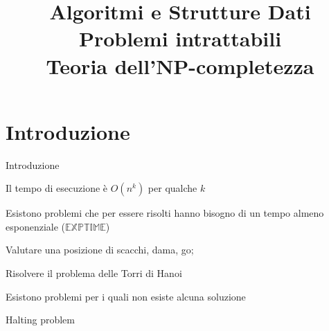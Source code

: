 
\title[ASD - Problemi \NP-completi]{\textbf{Algoritmi e Strutture Dati}\\[12pt]Problemi intrattabili\\Teoria dell'NP-completezza}


\usepackage{xcolor}
\usepackage{colortbl}

\newcommand{\PTIME}{\mbox{\sc $\mathbb{P}$}}
\renewcommand{\NP}{\mbox{$\mathbb{NP}$}}
\newcommand{\TIME}{\mbox{$\mathbb{TIME}$}}
\newcommand{\EXPTIME}{\mbox{$\mathbb{EXPTIME}$}}
\newcommand{\SPACE}{\mbox{$\mathbb{SPACE}$}}
\newcommand{\PSPACE}{\mbox{$\mathbb{PSPACE}$}}

\newcommand{\R}[1]{\textcolor{red}{#1}}
\newcommand{\B}[1]{\textcolor{blue}{#1}}

\renewcommand{\arraystretch}{1.4}
\graphicspath{{figs/18/}}




\FrameTitle{}

\FrameContent



\section{Introduzione}

\begin{frame}{Introduzione}

\vspace{-9pt}
\BIL
\item  Il tempo di esecuzione è $O(n^k)$ per qualche $k$
\EIL

\medskip
{}
\BIL
\item Esistono problemi che per essere risolti hanno
  bisogno di un tempo almeno esponenziale (\EXPTIME)
    \BI
    \item Valutare una posizione di scacchi, dama, go; 
    \item Risolvere il problema delle Torri di Hanoi
    \EI
\item Esistono problemi per i quali non esiste alcuna soluzione
  \BI
  \item Halting problem
  \EI
\EIL

\end{frame}

